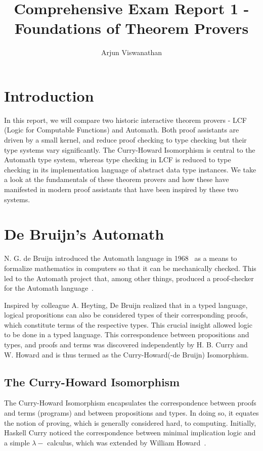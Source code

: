 \documentclass{article}
\begin{document}
\title{Comprehensive Exam Report 1 - Foundations of Theorem Provers}
\author{Arjun Viswanathan}
\date{}
\maketitle

\section{Introduction}
\label{sec:intro}
	In this report, we will compare two historic 
	interactive theorem provers - LCF (Logic for 
	Computable Functions) and Automath. Both proof 
	assistants are driven by a small kernel, and 
	reduce proof checking to type checking but 
	their type systems vary significantly. 
	The Curry-Howard Isomorphism is central 
	to the Automath type system,
	whereas type checking in LCF 
	is reduced to type checking in its 
	implementation language of abstract data 
	type instances. We take a look at the 
	fundamentals of these theorem provers and how 
	these have manifested in modern proof 
	assistants that have been inspired by these 
	two systems.

\section{De Bruijn's Automath}
\label{sec:automath}
	N. G. de Bruijn introduced the Automath 
	language in 
	1968~\cite{deBruijn1983, 10.1007/BFb0060623} 
	as a means to formalize mathematics in 
	computers so that it can be mechanically
	checked. This led to the Automath 
	project that, among other things, 
	produced a proof-checker for the Automath language~\cite{5df50ef4ddff4ff091125a511f563319, 
	c398556a074e49a193d5035ae32aaa79}.

	Inspired by colleague A. Heyting, De Bruijn 
	realized that in a typed language, logical 
	propositions can also be considered types 
	of their corresponding proofs, which  
	constitute terms of the respective types.
	This crucial insight allowed logic to be 
	done in a typed language. This 
	correspondence between propositions 
	and types, and proofs and terms was 
	discovered independently by H. B. Curry 
	and W. Howard and is thus termed as 
	the Curry-Howard(-de Bruijn) Isomorphism.
	
	\subsection{The Curry-Howard Isomorphism}
	\label{sec:curry}
	The Curry-Howard Isomorphism encapsulates 
	the correspondence between proofs and 
	terms (programs) and between propositions
	and types. In doing so, it equates the 
	notion of proving, which is generally 
	considered hard, to computing.
	Initially, Haskell Curry noticed the 
	correspondence between minimal 
	implication logic and a simple 
	$\lambda-$ calculus, which was extended
	by William 
	Howard~\cite{Howard1995-HOWTFN}.
	
\end{document}
